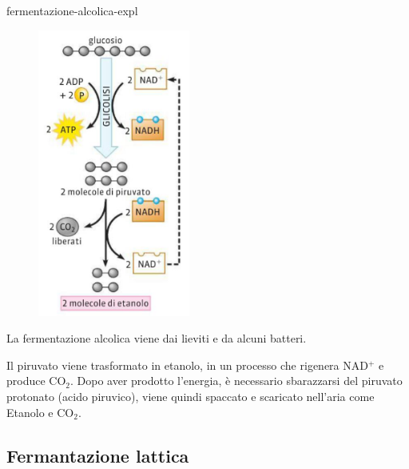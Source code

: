 \documentclass[preview]{standalone}
\begin{document}
\begin{snippet}{fermentazione-alcolica-expl}
    \setlength{\intextsep}{0pt}%
    \begin{figure}
        \includegraphics[width=5cm]{./resources/fermentazione-alcolica.png}
    \end{figure}
    La fermentazione alcolica viene dai lieviti e da alcuni batteri.
    
    Il piruvato viene trasformato in etanolo, in un processo che rigenera NAD\({}^+\) e produce CO\({}_2\).
    Dopo aver prodotto l'energia, è necessario sbarazzarsi del piruvato protonato (acido piruvico),
    viene quindi spaccato e scaricato nell'aria come Etanolo e CO\({}_2\).
    \wrapfill
\end{snippet}

\subsection{Fermantazione lattica}
\end{document}
